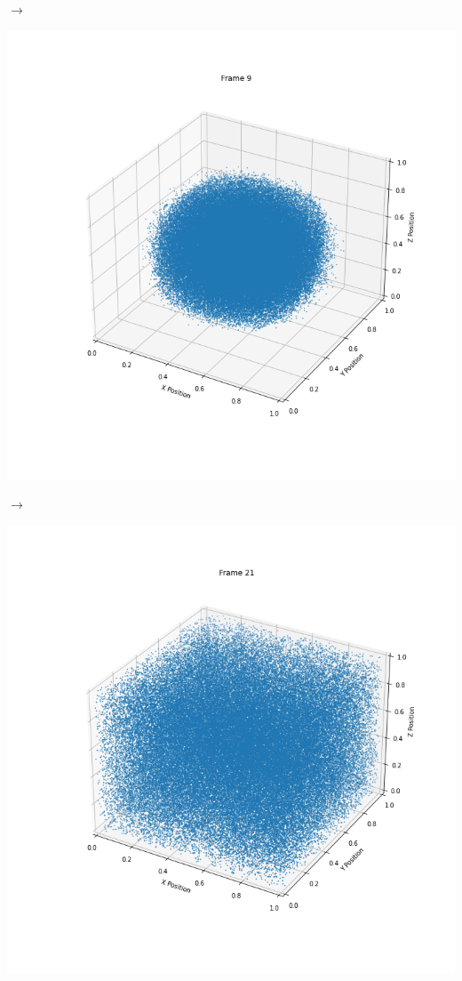 \begin{frame}{}
\begin{minipage}[c]{\textwidth}
\begin{minipage}{0.25\textwidth}
        \end{minipage}
        $\longrightarrow$
        \begin{minipage}{0.25\textwidth}
            \includegraphics[width=\textwidth]{ressources/particle_expansion/position_8}
        \end{minipage}
        $\longrightarrow$
        \begin{minipage}{0.25\textwidth}
            \includegraphics[width=\textwidth]{ressources/particle_expansion/position_20}
        \end{minipage}
    \end{minipage}
\end{frame}

